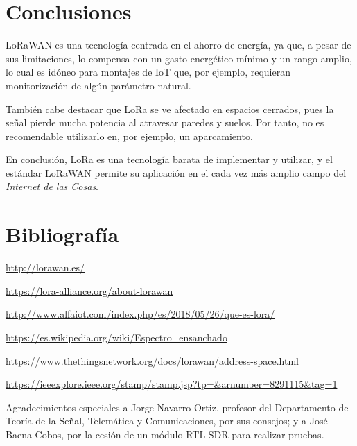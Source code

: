 \documentclass[11pt,a4paper]{article}
\begin{document}
\section{Conclusiones}
LoRaWAN es una tecnología centrada en el ahorro de energía, ya que, a pesar de sus limitaciones, lo compensa con un gasto energético mínimo y un rango amplio, lo cual es idóneo para montajes de IoT que, por ejemplo, requieran monitorización de algún parámetro natural. 

\medskip

También cabe destacar que LoRa se ve afectado en espacios cerrados, pues la señal pierde mucha potencia al atravesar paredes y suelos. Por tanto, no es recomendable utilizarlo en, por ejemplo, un aparcamiento.

\medskip

En conclusión, LoRa es una tecnología barata de implementar y utilizar, y el estándar LoRaWAN permite su aplicación en el cada vez más amplio campo del \textit{Internet de las Cosas}.

\newpage

\section{Bibliografía}
\url{http://lorawan.es/}

\url{https://lora-alliance.org/about-lorawan}

\url{http://www.alfaiot.com/index.php/es/2018/05/26/que-es-lora/}

\url{https://es.wikipedia.org/wiki/Espectro_ensanchado}

\url{https://www.thethingsnetwork.org/docs/lorawan/address-space.html}

\url{https://ieeexplore.ieee.org/stamp/stamp.jsp?tp=&arnumber=8291115&tag=1}

\medskip

Agradecimientos especiales a Jorge Navarro Ortiz, profesor del Departamento de Teoría de la Señal, Telemática y Comunicaciones, por sus consejos; y a José Baena Cobos, por la cesión de un módulo RTL-SDR para realizar pruebas.
\end{document}
